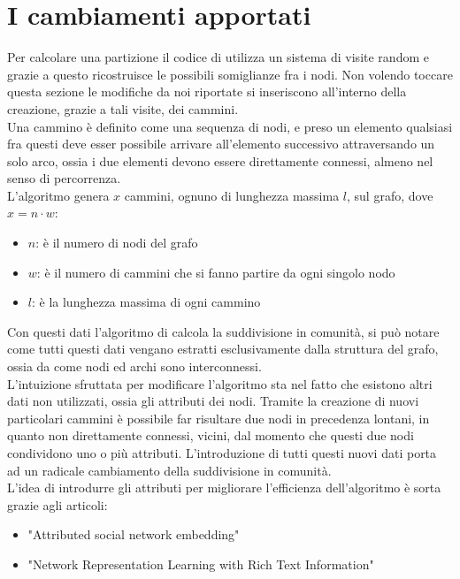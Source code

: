 \section{I cambiamenti apportati}
Per calcolare una partizione il codice di \cnrl utilizza un sistema di visite random e grazie a questo ricostruisce le possibili somiglianze fra i nodi. Non volendo toccare questa sezione le modifiche da noi riportate si inseriscono all'interno della creazione, grazie a tali visite, dei cammini.\\
Una cammino è definito come una sequenza di nodi, e preso un elemento qualsiasi fra questi deve esser possibile arrivare all'elemento successivo attraversando un solo arco, ossia i due elementi devono essere direttamente connessi, almeno nel senso di percorrenza.\\
L'algoritmo genera $x$ cammini, ognuno di lunghezza massima $l$, sul grafo, dove $x=n \cdot w$:
\begin{itemize}
	\item $n$: è il numero di nodi del grafo
	\item $w$: è il numero di cammini che si fanno partire da ogni singolo nodo
	\item $l$: è la lunghezza massima di ogni cammino
\end{itemize}
%
Con questi dati l'algoritmo di \cnrl calcola la suddivisione in comunità, si può notare come tutti questi dati vengano estratti esclusivamente dalla struttura del grafo, ossia da come nodi ed archi sono interconnessi.\\
L'intuizione sfruttata per modificare l'algoritmo sta nel fatto che esistono altri dati non utilizzati, ossia gli attributi dei nodi. Tramite la creazione di nuovi particolari cammini è possibile far risultare due nodi in precedenza lontani, in quanto non direttamente connessi, vicini, dal momento che questi due nodi condividono uno o più attributi. L'introduzione di tutti questi nuovi dati porta ad un radicale cambiamento della suddivisione in comunità.\\
L'idea di introdurre gli attributi per migliorare l'efficienza dell'algoritmo è sorta grazie agli articoli:
\begin{itemize}
	\item "Attributed social network embedding"\cite{SNE_paper}
	\item "Network Representation Learning with Rich Text Information"\cite{TADW_paper}
\end{itemize}
%
